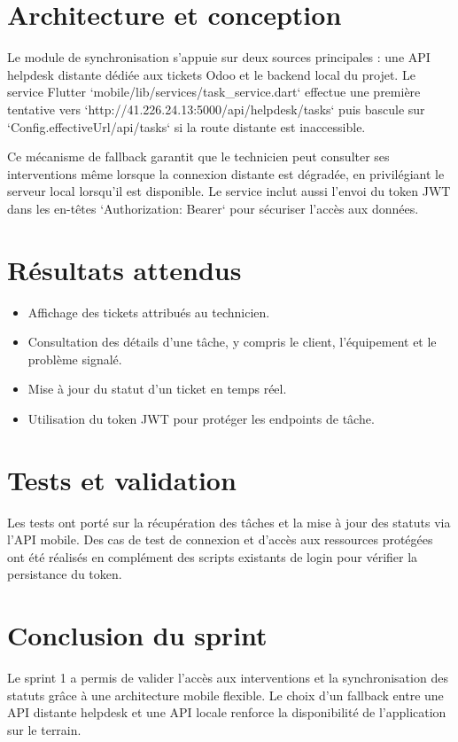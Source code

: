 \documentclass[12pt,a4paper]{report}
\begin{document}
\section{Architecture et conception}
\noindent Le module de synchronisation s'appuie sur deux sources principales : une API helpdesk distante dédiée aux tickets Odoo et le backend local du projet. Le service Flutter `mobile/lib/services/task_service.dart` effectue une première tentative vers `http://41.226.24.13:5000/api/helpdesk/tasks` puis bascule sur `Config.effectiveUrl/api/tasks` si la route distante est inaccessible.

\noindent Ce mécanisme de fallback garantit que le technicien peut consulter ses interventions même lorsque la connexion distante est dégradée, en privilégiant le serveur local lorsqu'il est disponible. Le service inclut aussi l'envoi du token JWT dans les en-têtes `Authorization: Bearer` pour sécuriser l'accès aux données.

\section{Résultats attendus}
\begin{itemize}
    \item Affichage des tickets attribués au technicien.
    \item Consultation des détails d'une tâche, y compris le client, l'équipement et le problème signalé.
    \item Mise à jour du statut d'un ticket en temps réel.
    \item Utilisation du token JWT pour protéger les endpoints de tâche.
\end{itemize}

\section{Tests et validation}
\noindent Les tests ont porté sur la récupération des tâches et la mise à jour des statuts via l'API mobile. Des cas de test de connexion et d'accès aux ressources protégées ont été réalisés en complément des scripts existants de login pour vérifier la persistance du token.

\section{Conclusion du sprint}
\noindent Le sprint 1 a permis de valider l'accès aux interventions et la synchronisation des statuts grâce à une architecture mobile flexible. Le choix d'un fallback entre une API distante helpdesk et une API locale renforce la disponibilité de l'application sur le terrain.
\end{document}
